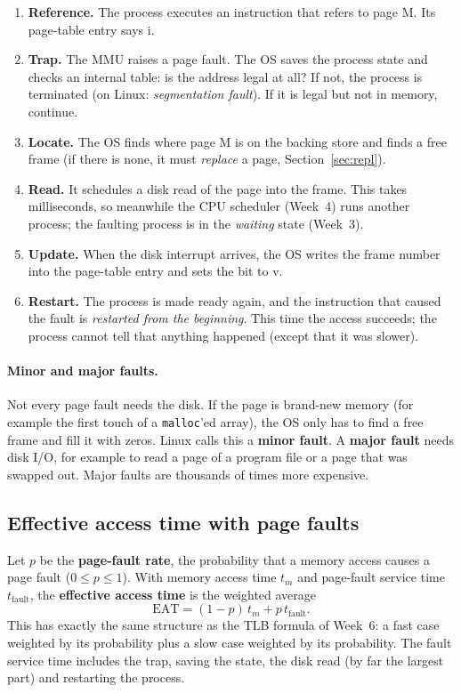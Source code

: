 \documentclass[11pt,a4paper]{article}
\newcommand{\term}[1]{\textbf{\color{mintdeep}#1}}
\newcommand{\cmd}[1]{\texttt{#1}}
\begin{document}
\begin{enumerate}[leftmargin=1.4em]
  \item \textbf{Reference.} The process executes an instruction that refers to page M. Its page-table entry says i.
  \item \textbf{Trap.} The MMU raises a page fault. The OS saves the process state and checks an internal table: is the address legal at all? If not, the process is terminated (on Linux: \emph{segmentation fault}). If it is legal but not in memory, continue.
  \item \textbf{Locate.} The OS finds where page M is on the backing store and finds a free frame (if there is none, it must \emph{replace} a page, Section~\ref{sec:repl}).
  \item \textbf{Read.} It schedules a disk read of the page into the frame. This takes milliseconds, so meanwhile the CPU scheduler (Week~4) runs another process; the faulting process is in the \emph{waiting} state (Week~3).
  \item \textbf{Update.} When the disk interrupt arrives, the OS writes the frame number into the page-table entry and sets the bit to v.
  \item \textbf{Restart.} The process is made ready again, and the instruction that caused the fault is \emph{restarted from the beginning}. This time the access succeeds; the process cannot tell that anything happened (except that it was slower).
\end{enumerate}

\paragraph{Minor and major faults.} Not every page fault needs the disk. If the page is brand-new memory (for example the first touch of a \cmd{malloc}'ed array), the OS only has to find a free frame and fill it with zeros. Linux calls this a \term{minor fault}. A \term{major fault} needs disk I/O, for example to read a page of a program file or a page that was swapped out. Major faults are thousands of times more expensive.

\subsection{Effective access time with page faults}

Let $p$ be the \term{page-fault rate}, the probability that a memory access causes a page fault ($0 \le p \le 1$). With memory access time $t_m$ and page-fault service time $t_{\text{fault}}$, the \term{effective access time} is the weighted average
\[
\text{EAT} = (1-p)\, t_m + p\, t_{\text{fault}} .
\]
This has exactly the same structure as the TLB formula of Week~6: a fast case weighted by its probability plus a slow case weighted by its probability. The fault service time includes the trap, saving the state, the disk read (by far the largest part) and restarting the process.
\end{document}
